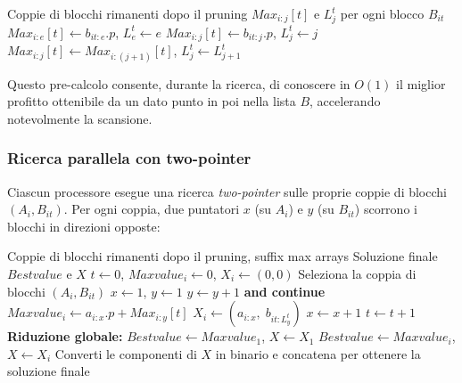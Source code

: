 \documentclass[11pt]{article}
\begin{document}
\begin{algorithm}[H]
\caption{Secondo salvataggio parallelo dei massimi (suffix max)}\label{alg:parallel_suffix_max}
\begin{algorithmic}
\Require Coppie di blocchi rimanenti dopo il pruning
\Ensure $Max_{i:j}[t]$ e $L^t_j$ per ogni blocco $B_{it}$
        \State $Max_{i:e}[t] \gets b_{it:e}.p$, \quad $L^t_e \gets e$
                \State $Max_{i:j}[t] \gets b_{it:j}.p$, \quad $L^t_j \gets j$
            \Else
                \State $Max_{i:j}[t] \gets Max_{i:(j+1)}[t]$, \quad $L^t_j \gets L^t_{j+1}$
            \EndIf
        \EndFor
    \EndFor
\EndFor
\end{algorithmic}
\end{algorithm}

Questo pre-calcolo consente, durante la ricerca, di conoscere in $O(1)$ il miglior profitto ottenibile da un dato punto in poi nella lista $B$, accelerando notevolmente la scansione.

\subsubsection{Ricerca parallela con two-pointer}
Ciascun processore esegue una ricerca \textit{two-pointer} sulle proprie coppie di blocchi $(A_i, B_{it})$. Per ogni coppia, due puntatori $x$ (su $A_i$) e $y$ (su $B_{it}$) scorrono i blocchi in direzioni opposte:

\begin{algorithm}[H]
\caption{Ricerca parallela (two-pointer search)}\label{alg:parallel_search}
\begin{algorithmic}
\Require Coppie di blocchi rimanenti dopo il pruning, suffix max arrays
\Ensure Soluzione finale $Bestvalue$ e $X$
    \State $t \gets 0$, $Maxvalue_i \gets 0$, $X_i \gets (0,0)$
        \State Seleziona la coppia di blocchi $(A_i, B_{it})$
        \State $x \gets 1$, $y \gets 1$
                \State $y \gets y + 1$ \textbf{and continue}
            \EndIf
                \State $Maxvalue_i \gets a_{i:x}.p + Max_{i:y}[t]$
                \State $X_i \gets (a_{i:x},\; b_{it:L^t_y})$
            \EndIf
            \State $x \gets x + 1$
        \EndWhile
        \State $t \gets t + 1$
    \EndWhile
\EndFor
\State \textbf{Riduzione globale:} $Bestvalue \gets Maxvalue_1$, $X \gets X_1$
        \State $Bestvalue \gets Maxvalue_i$, \quad $X \gets X_i$
    \EndIf
\EndFor
\State Converti le componenti di $X$ in binario e concatena per ottenere la soluzione finale
\end{algorithmic}
\end{algorithm}
\end{document}
